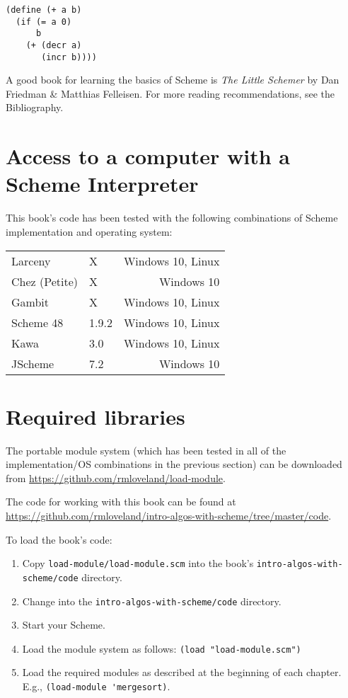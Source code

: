 \documentclass[12pt,openright,draft]{book}
\begin{document}
\begin{verbatim}
(define (+ a b)
  (if (= a 0)
      b
    (+ (decr a)
       (incr b))))
\end{verbatim}

A good book for learning the basics of Scheme is \emph{The Little
  Schemer} by Dan Friedman \& Matthias Felleisen.  For more
reading recommendations, see the Bibliography. %

\section{Access to a computer with a Scheme Interpreter}

This book's code has been tested with the following combinations of
Scheme implementation and operating system:

\begin{tabular}{ l m r }
Larceny        & X     & Windows 10, Linux \\
Chez (Petite)  & X     & Windows 10        \\
Gambit         & X     & Windows 10, Linux \\
Scheme 48      & 1.9.2 & Windows 10, Linux \\
Kawa           & 3.0   & Windows 10, Linux \\
JScheme        & 7.2   & Windows 10
\end{tabular}

\section{Required libraries}

The portable module system (which has been tested in all of the
implementation/OS combinations in the previous section) can be
downloaded from \url{https://github.com/rmloveland/load-module}.

The code for working with this book can be found at
\url{https://github.com/rmloveland/intro-algos-with-scheme/tree/master/code}.

To load the book's code:

\begin{enumerate}

\item Copy \verb|load-module/load-module.scm| into the book's
  \verb|intro-algos-with-scheme/code| directory.

\item Change into the \verb|intro-algos-with-scheme/code| directory.

\item Start your Scheme.

\item Load the module system as follows:
  \verb|(load "load-module.scm")|

\item Load the required modules as described at the beginning of each
  chapter.
  E.g., \verb|(load-module 'mergesort)|.

\end{enumerate}
\end{document}
